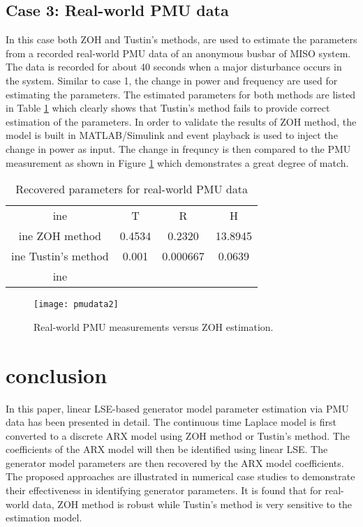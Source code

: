 \documentclass[10pt,journal,final]{IEEEtran}
\begin{document}
{
\subsection{Case 3: Real-world PMU data}
In this case both ZOH and Tustin's methods, are used to estimate the parameters from a recorded real-world PMU data of an anonymous busbar of MISO system. The data is recorded for about 40 seconds when a major disturbance occurs in the system. Similar to case 1, the change in power and frequency are used for estimating the parameters. The estimated parameters for both methods are listed in Table \ref{table:estimatedpmu} which clearly shows that Tustin's method fails to provide correct estimation of the parameters. In order to validate the results of ZOH method, the model is built in MATLAB/Simulink and event playback is used to inject the change in power as input. The change in frequncy is then compared to the PMU measurement as shown in Figure \ref{fig:rea} which demonstrates a great degree of match.}
\begin{table}[h]
\centering
\caption{Recovered parameters for real-world PMU data}
\label{table:estimatedpmu}
\begin{tabular}{|c|c|c|c|}
ine
                & T      & R        & H       \\ ine
ZOH method      & 0.4534 & 0.2320   & 13.8945 \\ ine
Tustin's method & 0.001  & 0.000667 & 0.0639  \\ ine
\end{tabular}
\end{table}
\begin{figure}[h!]
\centering
\texttt{[image: pmudata2]}
\caption{Real-world PMU measurements versus ZOH estimation.}
\label{fig:rea}
\end{figure}



\section{conclusion}
\label{conclusion}
In this paper, linear LSE-based generator model parameter estimation via PMU data has been presented in detail. The continuous time Laplace model is first converted to a discrete ARX model using ZOH method or Tustin's method. The coefficients of the ARX model will then be identified using linear LSE. The generator model parameters are then recovered by the ARX model coefficients. The proposed approaches are illustrated in numerical case studies to demonstrate their effectiveness in identifying generator parameters. It is found that for real-world data, ZOH method is robust while Tustin's method is very sensitive to the estimation model.


\end{document}
